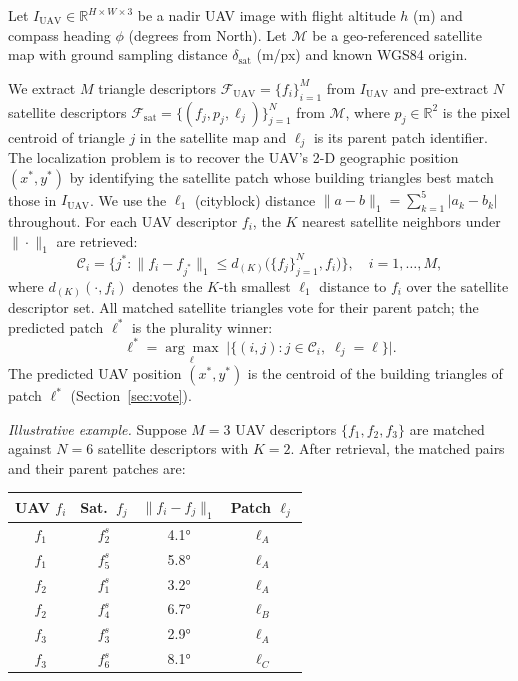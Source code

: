 \documentclass[10pt]{article}
\theoremstyle{plain}
\theoremstyle{definition}
\begin{document}
Let $I_{\mathrm{UAV}} \in \mathbb{R}^{H \times W \times 3}$ be a nadir UAV
image with flight altitude $h$ (m) and compass heading $\phi$ (degrees from
North).
Let $\mathcal{M}$ be a geo-referenced satellite map with ground sampling
distance $\delta_{\mathrm{sat}}$ (m/px) and known WGS84 origin.

We extract $M$ triangle descriptors
$\mathcal{F}_{\mathrm{UAV}} = \{f_i\}_{i=1}^{M}$ from $I_{\mathrm{UAV}}$
and pre-extract $N$ satellite descriptors
$\mathcal{F}_{\mathrm{sat}} = \{(f_j, p_j, \ell_j)\}_{j=1}^{N}$ from
$\mathcal{M}$, where $p_j \in \mathbb{R}^2$ is the pixel centroid of triangle
$j$ in the satellite map and $\ell_j$ is its parent patch identifier.
The localization problem is to recover the UAV's 2-D geographic position
$(x^*, y^*)$ by identifying the satellite patch whose building triangles best
match those in $I_{\mathrm{UAV}}$.
We use the $\ell_1$ (cityblock) distance $\|a - b\|_1 = \sum_{k=1}^{5}|a_k - b_k|$
throughout. For each UAV descriptor $f_i$, the $K$ nearest satellite
neighbors under $\|\cdot\|_1$ are retrieved:
\begin{equation}
\mathcal{C}_i = \bigl\{j^* :
  \|f_i - f_{j^*}\|_1 \le d_{(K)}\bigl(\{f_j\}_{j=1}^N, f_i\bigr)\bigr\},
\quad i = 1,\ldots,M,
\label{eq:retrieval}
\end{equation}
where $d_{(K)}(\cdot, f_i)$ denotes the $K$-th smallest $\ell_1$ distance
to $f_i$ over the satellite descriptor set.
All matched satellite triangles vote for their parent patch; the predicted
patch $\ell^*$ is the plurality winner:
\begin{equation}
\ell^* = \underset{\ell}{\arg\max}
\;\bigl|\{(i,j) : j \in \mathcal{C}_i,\;\ell_j = \ell\}\bigr|.
\label{eq:vote}
\end{equation}
The predicted UAV position $(x^*, y^*)$ is the centroid of the building
triangles of patch $\ell^*$ (Section~\ref{sec:vote}).

\noindent\textit{Illustrative example.}
Suppose $M=3$ UAV descriptors $\{f_1,f_2,f_3\}$ are matched against $N=6$
satellite descriptors with $K=2$.
After retrieval, the matched pairs and their parent patches are:

\begin{center}
\small
\begin{tabular}{cccc}
\toprule
UAV $f_i$ & Sat.\ $f_j$ & $\|f_i-f_j\|_1$ & Patch $\ell_j$\\
\midrule
$f_1$ & $f_2^s$ & 4.1° & $\ell_A$ \\
$f_1$ & $f_5^s$ & 5.8° & $\ell_A$ \\
$f_2$ & $f_1^s$ & 3.2° & $\ell_A$ \\
$f_2$ & $f_4^s$ & 6.7° & $\ell_B$ \\
$f_3$ & $f_3^s$ & 2.9° & $\ell_A$ \\
$f_3$ & $f_6^s$ & 8.1° & $\ell_C$ \\
\bottomrule
\end{tabular}
\end{center}
\end{document}
